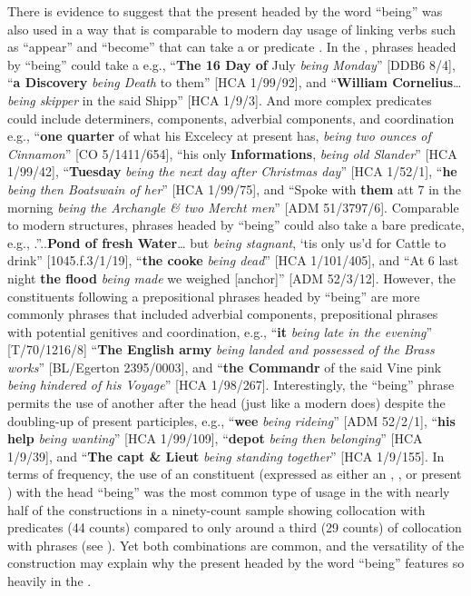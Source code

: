 There is evidence to suggest that the present  headed by the word “being” was also used in a way that is comparable to modern day usage of linking verbs such as “appear” and “become” that can take a  or predicate . In the ,  phrases headed by “being” could take a  e.g., “\textbf{The 16 Day of} July \textit{being Monday}” [DDB6 8/4], “\textbf{a Discovery} \textit{being Death} to them” [HCA 1/99/92], and “\textbf{William Cornelius}…\textit{being skipper} in the said Shipp” [HCA 1/9/3]. And more complex  predicates could include determiners,  components, adverbial components, and coordination e.g., “\textbf{one quarter} of what his Excelecy at present has, \textit{being two ounces of Cinnamon}” [CO 5/1411/654], “his only \textbf{Informations}, \textit{being old Slander}” [HCA 1/99/42], “\textbf{Tuesday} \textit{being the next day after Christmas day}” [HCA 1/52/1], “\textbf{he} \textit{being then Boatswain of her}” [HCA 1/99/75], and “Spoke with \textbf{them} att 7 in the morning \textit{being the Archangle \& two Mercht men}” [ADM 51/3797/6]. Comparable to modern  structures,  phrases headed by “being” could also take a bare  predicate, e.g., .”..\textbf{Pond of fresh Water}… but \textit{being stagnant}, ‘tis only us’d for Cattle to drink” [1045.f.3/1/19], “\textbf{the cooke} \textit{being dead}” [HCA 1/101/405], and “At 6 last night \textbf{the flood} \textit{being made} we weighed [anchor]” [ADM 52/3/12]. However, the  constituents following a prepositional phrases headed by “being” are more commonly  phrases that included adverbial components, prepositional phrases with potential genitives and coordination, e.g., “\textbf{it} \textit{being late in the evening}” [T/70/1216/8] “\textbf{The English army} \textit{being landed and possessed of the Brass works}” [BL/Egerton 2395/0003], and “\textbf{the Commandr} of the said Vine pink \textit{being hindered of his Voyage}” [HCA 1/98/267]. Interestingly, the “being” phrase permits the use of another   after the  head (just like a modern  does) despite the doubling-up of present participles, e.g., “\textbf{wee} \textit{being rideing}” [ADM 52/2/1], “\textbf{his help} \textit{being wanting}” [HCA 1/99/109], “\textbf{depot} \textit{being then belonging}” [HCA 1/9/39], and “\textbf{The capt \& Lieut} \textit{being standing together}” [HCA 1/9/155]. In terms of frequency, the use of an  constituent (expressed as either an , , or present ) with the  head “being” was the most common type of usage in the  with nearly half of the constructions in a ninety-count sample showing collocation with  predicates (44 counts) compared to only around a third (29 counts) of collocation with  phrases (see ). Yet both combinations are common, and the versatility of the construction may explain why the present  headed by the word “being” features so heavily in the . 

